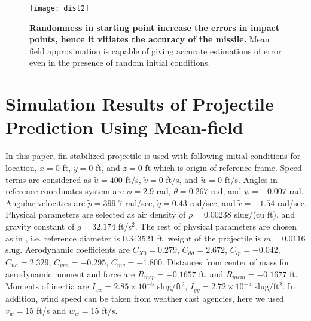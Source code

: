 \documentclass[letterpaper, 10 pt, conference]{ieeeconf}  %
\begin{document}
\begin{figure}[!t]
\centering
\texttt{[image: dist2]}
\caption{\textbf{Randomness in starting point increase the errors in impact points, hence it vitiates the accuracy of the missile.} Mean field approximation is capable of giving accurate estimations of error even in the presence of random initial conditions.}
\label{fig:comparison}
\end{figure}


\section{Simulation Results of Projectile Prediction Using Mean-field}

In this paper, fin stabilized projectile is used with following initial conditions for location, $x=0$ ft, $y=0$ ft, and $z=0$ ft which is origin of reference frame. Speed terms are considered as $\tilde{u}=400$ ft/s, $\tilde{v}=0$ ft/s, and $\tilde{w}=0$ ft/s. Angles in reference coordinates system are $\phi=2.9$ rad, $\theta=0.267$ rad, and $\psi=-0.007$ rad. Angular velocities are $\tilde{p}=399.7$ rad/sec, $\tilde{q}=0.43$ rad/sec, and $\tilde{r}=-1.54$ rad/sec. Physical parameters are selected as air density of $\rho=0.00238$ slug/(cu ft), and gravity constant of $g=32.174$ ft/s$^2$. The rest of physical parameters are chosen as in \cite{costello2004flight}, i.e. reference diameter is $0.343521$ ft, weight of the projectile is $m=0.0116$ slug. Aerodynamic coefficients are $C_{X0}=0.279$, $C_{dd}=2.672$, $C_{lp}=-0.042$, $C_{na}=2.329$, $C_{ypa}=-0.295$, $C_{mq}=-1.800$. Distances from center of mass for aerodynamic moment and force are $R_{mcp}=-0.1657$ ft, and $R_{mcm}=-0.1677$ ft. Moments of inertia are $I_{xx}=2.85\times10^{-5}$ slug/ft$^2$, $I_{yy}=2.72\times10^{-5}$ slug/ft$^2$\cite{costello2004flight}. In addition, wind speed can be taken from weather cast agencies, here we used $\tilde{v}_w=15$ ft/s and $\tilde{w}_w=15$ ft/s. 
\end{document}
